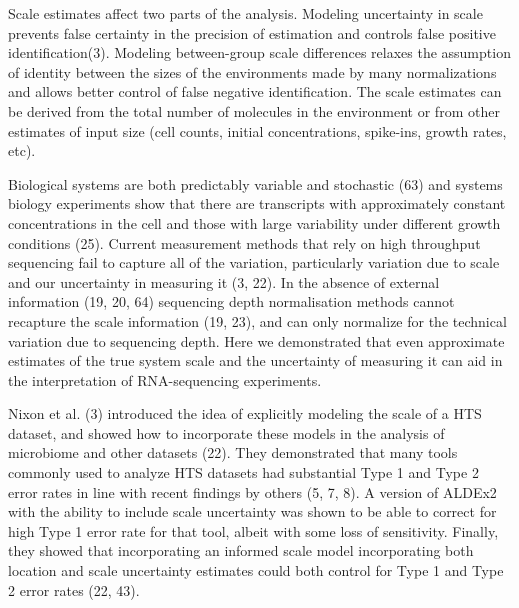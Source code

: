 \documentclass[
]{article}
\begin{document}
Scale estimates affect two parts of the analysis. Modeling uncertainty
in scale prevents false certainty in the precision of estimation and
controls false positive identification(3). Modeling between-group scale
differences relaxes the assumption of identity between the sizes of the
environments made by many normalizations and allows better control of
false negative identification. The scale estimates can be derived from
the total number of molecules in the environment or from other estimates
of input size (cell counts, initial concentrations, spike-ins, growth
rates, etc).

Biological systems are both predictably variable and stochastic (63) and
systems biology experiments show that there are transcripts with
approximately constant concentrations in the cell and those with large
variability under different growth conditions (25). Current measurement
methods that rely on high throughput sequencing fail to capture all of
the variation, particularly variation due to scale and our uncertainty
in measuring it (3, 22). In the absence of external information (19, 20,
64) sequencing depth normalisation methods cannot recapture the scale
information (19, 23), and can only normalize for the technical variation
due to sequencing depth. Here we demonstrated that even approximate
estimates of the true system scale and the uncertainty of measuring it
can aid in the interpretation of RNA-sequencing experiments.

Nixon et al. (3) introduced the idea of explicitly modeling the scale of
a HTS dataset, and showed how to incorporate these models in the
analysis of microbiome and other datasets (22). They demonstrated that
many tools commonly used to analyze HTS datasets had substantial Type 1
and Type 2 error rates in line with recent findings by others (5, 7, 8).
A version of ALDEx2 with the ability to include scale uncertainty was
shown to be able to correct for high Type 1 error rate for that tool,
albeit with some loss of sensitivity. Finally, they showed that
incorporating an informed scale model incorporating both location and
scale uncertainty estimates could both control for Type 1 and Type 2
error rates (22, 43).
\end{document}
